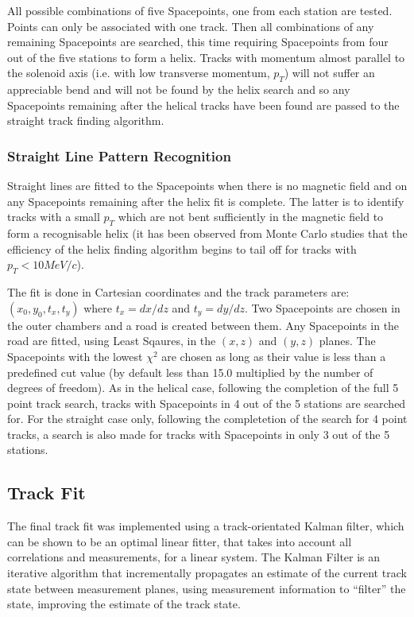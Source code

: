    All possible combinations of five Spacepoints, one from each station are tested. Points can only be associated with one track. Then all combinations of any remaining Spacepoints are searched, this time requiring Spacepoints from four out of the five stations to form a helix. Tracks with momentum almost parallel to the solenoid axis (i.e. with low transverse momentum, $p_T$) will not suffer an appreciable bend and will not be found by the helix search and so any Spacepoints remaining after the helical tracks have been found are passed to the straight track finding algorithm.

    \subsubsection{Straight Line Pattern Recognition}
    \label{subsubsec:StraightLinePatternRecognition}

    Straight lines are fitted to the Spacepoints when there is no magnetic field and on any Spacepoints remaining after the helix fit is complete. The latter is to identify tracks with a small $p_T$ which are not bent sufficiently in the magnetic field to form a recognisable helix (it has been observed from Monte Carlo studies that the efficiency of the helix finding algorithm begins to tail off for tracks with $p_T < 10 MeV/c$).

    The fit is done in Cartesian coordinates and the track parameters are: $(x_0, y_0, t_x, t_y)$ where $t_x = dx/dz$ and $t_y = dy/dz$. Two Spacepoints are chosen in the outer chambers and a road is created between them. Any Spacepoints in the road are fitted, using Least Sqaures, in the $(x,z)$ and $(y,z)$ planes. The Spacepoints with the lowest $\chi^2$ are chosen as long as their value is less than a predefined cut value (by default less than 15.0 multiplied by the number of degrees of freedom). As in the helical case, following the completion of the full 5 point track search, tracks with Spacepoints in 4 out of the 5 stations are searched for. For the straight case only, following the completetion of the search for 4 point tracks, a search is also made for tracks with Spacepoints in only 3 out of the 5 stations. 

   \subsection{Track Fit}
   \label{subsec:FinalTrackFit}
   The final track fit was implemented using a track-orientated Kalman filter\cite{Fruhwirth,Billoir}, which can be shown to be an optimal linear fitter, that takes into account all correlations and measurements, for a linear system. The Kalman Filter is an iterative algorithm that incrementally propagates an estimate of the current track state between measurement planes, using measurement information to ``filter'' the state, improving the estimate of the track state.
   
